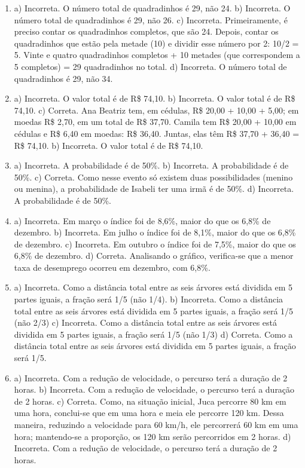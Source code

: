 \begin{enumerate}
\item
a) Incorreta. O número total de quadradinhos é 29, não 24.
b) Incorreta. O número total de quadradinhos é 29, não 26.
c) Incorreta. Primeiramente, é preciso contar os quadradinhos completos, 
que são 24. Depois, contar os quadradinhos que estão pela metade (10) e 
dividir esse número por 2: 10/2 = 5. Vinte e quatro quadradinhos 
completos + 10 metades (que correspondem a 5 completos) = 29 quadradinhos 
no total. 
d) Incorreta. O número total de quadradinhos é 29, não 34.

\item
a) Incorreta. O valor total é de R\$ 74,10.
b) Incorreta. O valor total é de R\$ 74,10.  
c) Correta. Ana Beatriz tem, em cédulas, R\$ 20,00 + 10,00 + 5,00; em
moedas R\$ 2,70, em um total de R\$ 37,70. Camila tem R\$ 20,00 + 10,00 
em cédulas e R\$ 6,40 em moedas: R\$ 36,40. Juntas, elas têm R\$ 37,70 + 
36,40 = R\$ 74,10.   
b) Incorreta. O valor total é de R\$ 74,10.

\item
a) Incorreta. A probabilidade é de 50\%.
b) Incorreta. A probabilidade é de 50\%. 
c) Correta. Como nesse evento só existem duas possibilidades (menino ou
menina), a probabilidade de Isabeli ter uma irmã é de 50\%.
d) Incorreta. A probabilidade é de 50\%.

\item
a) Incorreta. Em março o índice foi de 8,6\%, maior do que os 6,8\% de dezembro. 
b) Incorreta. Em julho o índice foi de 8,1\%, maior do que os 6,8\% de dezembro.
c) Incorreta. Em outubro o índice foi de 7,5\%, maior do que os 6,8\% de dezembro.
d) Correta. Analisando o gráfico, verifica-se que a menor taxa de 
desemprego ocorreu em dezembro, com 6,8\%.

\item
a) Incorreta. Como a distância total entre as seis árvores está dividida 
em 5 partes iguais, a fração será 1/5 (não 1/4).
b) Incorreta.  Como a distância total entre as seis árvores está dividida 
em 5 partes iguais, a fração será 1/5 (não 2/3)
c) Incorreta.  Como a distância total entre as seis árvores está dividida 
em 5 partes iguais, a fração será 1/5 (não 1/3)
d) Correta. Como a distância total entre as seis árvores está dividida em 
5 partes iguais, a fração será 1/5.

\item
a) Incorreta. Com a redução de velocidade, o percurso terá a duração de 2 horas.
b) Incorreta. Com a redução de velocidade, o percurso terá a duração de 2 horas.
c) Correta. Como, na situação inicial, Juca percorre 80 km em uma hora,
conclui-se que em uma hora e meia ele percorre 120 km. Dessa maneira,
reduzindo a velocidade para 60 km/h, ele percorrerá 60 km em uma hora; 
mantendo-se a proporção, os 120 km serão percorridos em 2 horas.
d) Incorreta. Com a redução de velocidade, o percurso terá a duração de 2 horas.


\end{enumerate}
